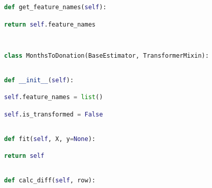 \documentclass[
  11pt,
  a4paper,
  DIV=12,captions=tableheading,oneside]{scrbook}
\begin{document}
\begin{lstlisting}[language=Python,stepnumber=2,basicstyle=\footnotesize]
    def get_feature_names(self):\end{lstlisting}
\begin{lstlisting}[language=Python,stepnumber=2,basicstyle=\footnotesize]
        return self.feature_names\end{lstlisting}
\begin{lstlisting}[language=Python,stepnumber=2,basicstyle=\footnotesize]
\end{lstlisting}
\begin{lstlisting}[language=Python,stepnumber=2,basicstyle=\footnotesize]
\end{lstlisting}
\begin{lstlisting}[language=Python,stepnumber=2,basicstyle=\footnotesize]
class MonthsToDonation(BaseEstimator, TransformerMixin):\end{lstlisting}
\begin{lstlisting}[language=Python,stepnumber=2,basicstyle=\footnotesize]
\end{lstlisting}
\begin{lstlisting}[language=Python,stepnumber=2,basicstyle=\footnotesize]
    def __init__(self):\end{lstlisting}
\begin{lstlisting}[language=Python,stepnumber=2,basicstyle=\footnotesize]
        self.feature_names = list()\end{lstlisting}
\begin{lstlisting}[language=Python,stepnumber=2,basicstyle=\footnotesize]
        self.is_transformed = False\end{lstlisting}
\begin{lstlisting}[language=Python,stepnumber=2,basicstyle=\footnotesize]
\end{lstlisting}
\begin{lstlisting}[language=Python,stepnumber=2,basicstyle=\footnotesize]
    def fit(self, X, y=None):\end{lstlisting}
\begin{lstlisting}[language=Python,stepnumber=2,basicstyle=\footnotesize]
        return self\end{lstlisting}
\begin{lstlisting}[language=Python,stepnumber=2,basicstyle=\footnotesize]
\end{lstlisting}
\begin{lstlisting}[language=Python,stepnumber=2,basicstyle=\footnotesize]
    def calc_diff(self, row):\end{lstlisting}
\end{document}

